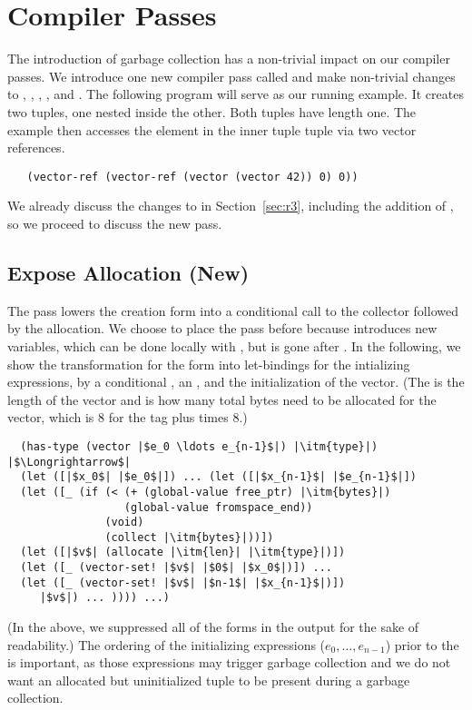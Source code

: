 \documentclass[11pt]{book}
\begin{document}
\section{Compiler Passes}
\label{sec:code-generation-gc}

The introduction of garbage collection has a non-trivial impact on our
compiler passes. We introduce one new compiler pass called
 and make non-trivial changes to
, , ,
, and .  The following
program will serve as our running example.  It creates two tuples, one
nested inside the other. Both tuples have length one. The example then
accesses the element in the inner tuple tuple via two vector
references.
\begin{lstlisting}
   (vector-ref (vector-ref (vector (vector 42)) 0) 0))
\end{lstlisting}

We already discuss the changes to  in
Section~\ref{sec:r3}, including the addition of , so we
proceed to discuss the new  pass.

\subsection{Expose Allocation (New)}
\label{sec:expose-allocation}

The pass  lowers the  creation
form into a conditional call to the collector followed by the
allocation. We choose to place the  pass
before  because  introduces new
variables, which can be done locally with , but 
is gone after .  In the following, we show the
transformation for the  form into let-bindings for the
intializing expressions, by a conditional , an
, and the initialization of the vector.
(The  is the length of the vector and  is how many
total bytes need to be allocated for the vector, which is 8 for the
tag plus  times 8.)

\begin{lstlisting}
  (has-type (vector |$e_0 \ldots e_{n-1}$|) |\itm{type}|)
|$\Longrightarrow$|
  (let ([|$x_0$| |$e_0$|]) ... (let ([|$x_{n-1}$| |$e_{n-1}$|])
  (let ([_ (if (< (+ (global-value free_ptr) |\itm{bytes}|)
                  (global-value fromspace_end))
               (void)
               (collect |\itm{bytes}|))])
  (let ([|$v$| (allocate |\itm{len}| |\itm{type}|)])
  (let ([_ (vector-set! |$v$| |$0$| |$x_0$|)]) ...
  (let ([_ (vector-set! |$v$| |$n-1$| |$x_{n-1}$|)])
     |$v$|) ... )))) ...)
\end{lstlisting}
(In the above, we suppressed all of the  forms in the
output for the sake of readability.)  The ordering of the initializing
expressions ($e_0,\ldots,e_{n-1}$) prior to the  is
important, as those expressions may trigger garbage collection and we
do not want an allocated but uninitialized tuple to be present during
a garbage collection.
\end{document}
